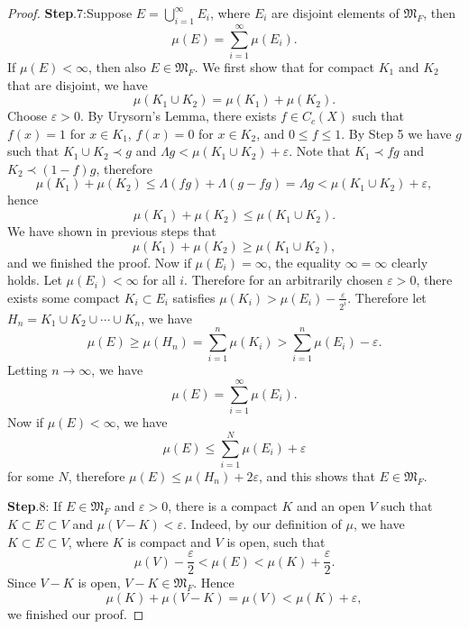 \begin{proof}
\textbf{Step}.7:Suppose $E=\bigcup_{i=1}^\infty E_i$, where $E_i$ are disjoint elements of $\mathfrak{M}_F$, then 
$$
\mu \left( E \right) =\sum_{i=1}^{\infty}{\mu \left( E_i \right)}.
$$
If $\mu(E)<\infty$, then also $E\in\mathfrak{M}_F$. We first show that for compact $K_1$ and $K_2$ that are disjoint, we have 
$$
\mu \left( K_1\cup K_2 \right)=\mu \left( K_1 \right) +\mu \left( K_2 \right) .
$$
Choose $\varepsilon>0$. By Urysorn's Lemma, there exists $f\in C_c(X)$ such that $f(x)=1$ for $x\in K_1$, $f(x)=0$ for $x\in K_2$, and $0\le f\le 1$. By Step 5 we have $g$ such that $K_1\cup K_2\prec g$ and $\Lambda g<\mu \left( K_1\cup K_2 \right) +\varepsilon $. Note that $K_1\prec fg$ and $K_2\prec (1-f)g$, therefore 
$$
\mu \left( K_1 \right) +\mu \left( K_2 \right) \le \Lambda \left( fg \right) +\Lambda \left( g-fg \right) =\Lambda g<\mu \left( K_1\cup K_2 \right) +\varepsilon ,
$$
hence
$$
\mu \left( K_1 \right) +\mu \left( K_2 \right) \le \mu \left( K_1\cup K_2 \right) .
$$
We have shown in previous steps that 
$$
\mu \left( K_1 \right) +\mu \left( K_2 \right) \ge \mu \left( K_1\cup K_2 \right) ,
$$
and we finished the proof. Now if $\mu(E_i)=\infty$, the equality $\infty=\infty$ clearly holds. Let $\mu(E_i)<\infty$ for all $i$. Therefore for an arbitrarily chosen $\varepsilon>0$, there exists some compact $K_i\subset E_i$ satisfies $\mu \left( K_i \right) >\mu \left( E_i \right) -\frac{\varepsilon}{2^i}$. Therefore let $H_n=K_1\cup K_2\cup\cdots\cup K_n$, we have 
$$
\mu \left( E \right) \ge \mu \left( H_n \right) =\sum_{i=1}^n{\mu \left( K_i \right)}>\sum_{i=1}^n{\mu \left( E_i \right)}-\varepsilon .
$$
Letting $n\to\infty$, we have 
$$
\mu \left( E \right) =\sum_{i=1}^{\infty}{\mu \left( E_i \right)}.
$$
Now if $\mu(E)<\infty$, we have 
$$
\mu \left( E \right) \le \sum_{i=1}^N{\mu \left( E_i \right)}+\varepsilon 
$$
for some $N$, therefore $\mu(E)\le\mu(H_n)+2\varepsilon$, and this shows that $E\in\mathfrak{M}_F$.\par
\textbf{Step}.8: If $E\in\mathfrak{M}_F$ and $\varepsilon>0$, there is a compact $K$ and an open $V$ such that $K\subset E\subset V$ and $\mu(V-K)<\varepsilon$. Indeed, by our definition of $\mu$, we have $K\subset E\subset V$, where $K$ is compact and $V$ is open, such that 
$$
\mu \left( V \right) -\frac{\varepsilon}{2}<\mu \left( E \right) <\mu \left( K \right) +\frac{\varepsilon}{2}.
$$
Since $V-K$ is open, $V-K\in\mathfrak{M}_F$. Hence 
$$
\mu \left( K \right) +\mu \left( V-K \right) =\mu \left( V \right) <\mu \left( K \right) +\varepsilon ,
$$
we finished our proof.\par

\end{proof}
